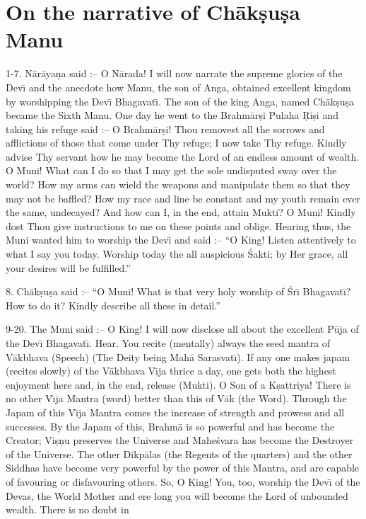 \chapter{On the narrative of Ch\=ak\d{s}u\d{s}a Manu}

1-7. N\=ar\=aya\d{n}a said :-- O N\=arada! I will now narrate the supreme glories of the Dev\={\i} and the anecdote how Manu, the son of Anga, obtained excellent kingdom by worshipping the Dev\={\i} Bhagavat\={\i}. The son of the king Anga, named Ch\=ak\d{s}u\d{s}a became the Sixth Manu. One day he went to the Brahm\=ar\d{s}i Pulaha \d{R}i\d{s}i and taking his refuge said :-- O Brahm\=ar\d{s}i! Thou removest all the sorrows and afflictions of those that come under Thy refuge; I now take Thy refuge. Kindly advise Thy servant how he may become the Lord of an endless amount of wealth. O Muni! What can I do so that I may get the sole undisputed sway over the world? How my arms can wield the weapons and manipulate them so that they may not be baffled? How my race and line be constant and my youth remain ever the same, undecayed? And how can I, in the end, attain Mukti? O Muni! Kindly dost Thou give instructions to me on these points and oblige. Hearing thus, the Muni wanted him to worship the Dev\={\i} and said :-- ``O King! Listen attentively to what I say you today. Worship today the all auspicious \'Sakti; by Her grace, all your desires will be fulfilled.''

8. Ch\=ak\d{s}u\d{s}a said :-- ``O Muni! What is that very holy worship of \'Sr\={\i} Bhagavat\={\i}? How to do it? Kindly describe all these in detail.''

9-20. The Muni said :-- O King! I will now disclose all about the excellent P\=uja of the Dev\={\i} Bhagavat\={\i}. Hear. You recite (mentally) always the seed mantra of V\=akbhava (Speech) (The Deity being Mah\=a Sarasvat\={\i}). If any one makes japam (recites slowly) of the V\=akbhava V\={\i}ja thrice a day, one gets both the highest enjoyment here and, in the end, release (Mukti). O Son of a K\d{s}attriya! There is no other V\={\i}ja Mantra (word) better than this of V\=ak (the Word). Through the Japam of this V\={\i}ja Mantra comes the increase of strength and prowess and all successes. By the Japam of this, Brahm\=a is so powerful and has become the Creator; Vi\d{s}\d{n}u preserves the Universe and Mahe\'svara has become the Destroyer of the Universe. The other Dikp\=alas (the Regents of the quarters) and the other Siddhas have become very powerful by the power of this Mantra, and are capable of favouring or disfavouring others. So, O King! You, too, worship the Dev\={\i} of the Devas, the World Mother and ere long you will become the Lord of unbounded wealth. There is no doubt in

